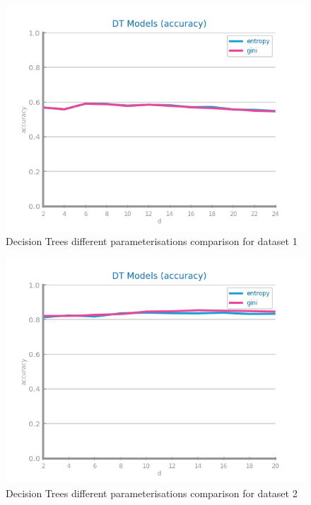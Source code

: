 \documentclass[10pt]{extarticle}
\begin{document}
\begin{figure}[H]
\centering\includegraphics[scale=0.95]{images/dataset1/models_evaluation/CovidPos_DT_accuracy_study.png}
\caption{Decision Trees different parameterisations comparison for dataset 1}
\end{figure}

\begin{figure}[H]
\centering\includegraphics[scale=0.95]{images/dataset2/models_evaluation/Credit_Score_dt_accuracy_study.png}
\caption{Decision Trees different parameterisations comparison for dataset 2}
\end{figure}
\end{document}

